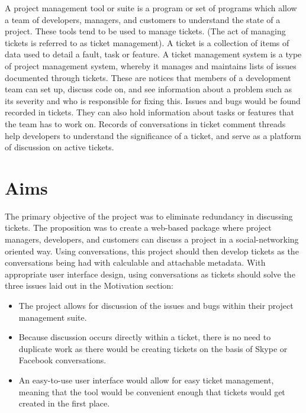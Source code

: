 \documentclass[a4paper]{l3proj}
\begin{document}
A project management tool or suite is a program or set of programs which allow a team of developers, managers, and customers to understand the state of a project. These tools tend to be used to manage tickets. (The act of managing tickets is referred to as ticket management). A ticket is a collection of items of data used to detail a fault, task or feature.  A ticket management system is a type of project management system, whereby it manages and maintains lists of issues documented through tickets. These are notices that members of a development team can set up, discuss code on, and see information about a problem such as its severity and who is responsible for fixing this. Issues and bugs would be found recorded in tickets. They can also hold information about tasks or features that the team has to work on. Records of conversations in ticket comment threads help developers to understand the significance of a ticket, and serve as a platform of discussion on active tickets.


\section{Aims}
\label{aims}

The primary objective of the project was to eliminate redundancy in discussing tickets. The proposition was to create a web-based package where project managers, developers, and customers can discuss a project in a social-networking oriented way. Using conversations, this project should then develop tickets as the conversations being had with calculable and attachable metadata. With appropriate user interface design, using conversations as tickets should solve the three issues laid out in the Motivation section:

\begin{itemize}
\item The project allows for discussion of the issues and bugs within their project management suite.
\item Because discussion occurs directly within a ticket, there is no need to duplicate work as there would be creating tickets on the basis of Skype or Facebook conversations.
\item An easy-to-use user interface would allow for easy ticket management, meaning that the tool would be convenient enough that tickets would get created in the first place.
\end{itemize}
\end{document}
